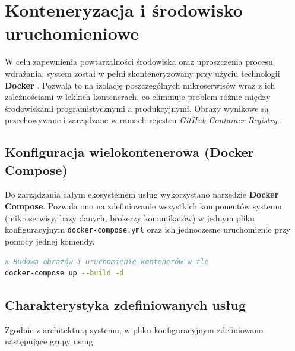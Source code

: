 \newpage
\renewcommand{\sectioncolor}{chap5}
\section{Konteneryzacja i środowisko uruchomieniowe}

W celu zapewnienia powtarzalności środowiska oraz uproszczenia procesu wdrażania, system został w pełni skonteneryzowany przy użyciu technologii \textbf{Docker} \cite{docker_docs}. Pozwala to na izolację poszczególnych mikroserwisów wraz z ich zależnościami w lekkich kontenerach, co eliminuje problem różnic między środowiskami programistycznymi a produkcyjnymi. Obrazy wynikowe są przechowywane i zarządzane w ramach rejestru \textit{GitHub Container Registry} \cite{ghcr_guide}.

\subsection{Konfiguracja wielokontenerowa (Docker Compose)}
Do zarządzania całym ekosystemem usług wykorzystano narzędzie \textbf{Docker Compose}. Pozwala ono na zdefiniowanie wszystkich komponentów systemu (mikroserwisy, bazy danych, brokerzy komunikatów) w jednym pliku konfiguracyjnym \texttt{docker-compose.yml} oraz ich jednoczesne uruchomienie przy pomocy jednej komendy.

\begin{lstlisting}[language=bash, caption={Uruchomienie całego stosu technologicznego systemu}]
# Budowa obrazów i uruchomienie kontenerów w tle
docker-compose up --build -d
\end{lstlisting}

\subsection{Charakterystyka zdefiniowanych usług}
Zgodnie z architekturą systemu, w pliku konfiguracyjnym zdefiniowano następujące grupy usług:

